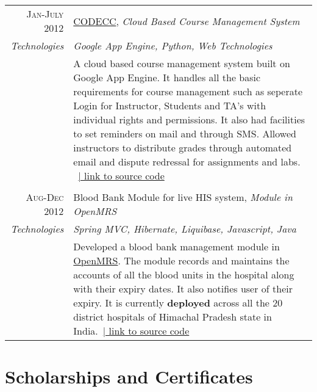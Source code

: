 \documentclass[a4paper,10pt]{article} %
\begin{document}
\begin{longtable}{r|p{13cm}}

\textsc{Jan-July 2012} & \href{http://www.codecc.co.nr/}{CODECC}, \emph{Cloud Based Course Management System}\\
\emph{Technologies} & \emph{Google App Engine, Python, Web Technologies}\\ 
& \small{ A cloud based course management system built on Google App Engine. It handles all the basic requirements for course management such as seperate Login for Instructor, Students and TA's with individual rights and permissions. It also had facilities to set reminders on mail and through SMS. Allowed instructors to distribute grades through automated email and dispute redressal for assignments and labs.} \ \href{https://github.com/am2990/codecc}{\hfill | link to source code}\\
\multicolumn{2}{c}{} \\


\textsc{Aug-Dec 2012} & Blood Bank Module for live HIS system, \emph{Module in OpenMRS}\\
\emph{Technologies} & \emph{Spring MVC, Hibernate, Liquibase, Javascript, Java }\\ 
& \small{Developed a blood bank management module in \href{http://openmrs.org/}{OpenMRS}. The module records and maintains the accounts of all the blood units in the hospital along with their expiry dates. It also notifies user of their expiry. It is currently \textbf{deployed} across all the 20 district hospitals of Himachal Pradesh state in India.}\ \href{https://github.com/hispindia/bloodbank}{\hfill | link to source code}
\end{longtable}



\section{\color{red} Scholarships and Certificates}
\end{document}
